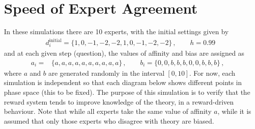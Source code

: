 \documentclass[preprintnumbers,aps,prd,floatfix,nofootinbib,onecolumn]{revtex4}
\begin{document}
\maketitle
\section{Speed of Expert Agreement}
In these simulations there are 10 experts, with the initial settings given by
\begin{align}
&d_i^{\text{initial}}={}\{1,0,-1,-2,-2,1,0,-1,-2,-2\}\,,\qquad h=0.99\nonumber
\end{align}
and at each given step (question), the values of affinity and bias are assigned as
\begin{align}
a_i={}&\{a,a,a,a,a,a,a,a,a,a\}\,,\qquad b_i={}\{0,0,b,b,b,0,0,b,b,b\}\,,\nonumber
\end{align}
where $a$ and $b$ are generated randomly in the interval $[0,10]$. For now, each simulation is independent so that each  diagram below shows different points in phase space (this to be fixed). The purpose of this simulation is to verify that the reward system tends to improve knowledge of the theory, in a reward-driven behaviour. Note that while all experts take the same value of  affinity  $a$, while it is assumed that only those experts who disagree with theory are biased. 
\end{document}
